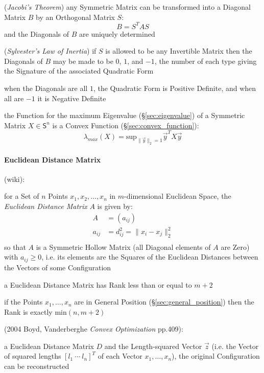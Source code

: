 (\emph{Jacobi's Theorem}) any Symmetric Matrix can be transformed into a
Diagonal Matrix $B$ by an Orthogonal Matrix $S$:
\[
  B = S^T A S
\]
and the Diagonals of $B$ are uniquely determined

(\emph{Sylvester's Law of Inertia}) if $S$ is allowed to be any Invertible
Matrix then the Diagonals of $B$ may be made to be $0$, $1$, and $-1$, the
number of each type giving the Signature of the associated Quadratic Form

when the Diagonals are all $1$, the Quadratic Form is Positive Definite, and
when all are $-1$ it is Negative Definite

the Function for the maximum Eigenvalue (\S\ref{sec:eigenvalue}) of a Symmetric
Matrix $X \in \mathsf{S}^n$ is a Convex Function (\S\ref{sec:convex_function}):
\[
  \lambda_{max}(X) = \mathrm{sup}_{\|\vec{y}\|_2=1} \vec{y}^T X \vec{y}
\]



\paragraph{Euclidean Distance Matrix}\label{sec:euclidean_distance_matrix}\hfill

(wiki):

for a Set of $n$ Points $x_1, x_2, \ldots, x_n$ in $m$-dimensional Euclidean
Space, the \emph{Euclidean Distance Matrix} $A$ is given by:
\begin{align*}
  A      & = (a_{ij}) \\
  a_{ij} & = d_{ij}^2 = \|x_i - x_j\|_2^2 \\
\end{align*}
so that $A$ is a Symmetric Hollow Matrix (all Diagonal elements of $A$ are
Zero) with $a_{ij} \geq 0$, i.e. its elements are the Squares of the Euclidean
Distances between the Vectors of some Configuration

a Euclidean Distance Matrix has Rank less than or equal to $m+2$

if the Points $x_1, \ldots, x_n$ are in General Position
(\S\ref{sec:general_position}) then the Rank is exactly $\mathrm{min}(n,m+2)$

(2004 Boyd, Vanderberghe \emph{Convex Optimization} pp.409):

a Euclidean Distance Matrix $D$ and the Length-squared Vector $\vec{z}$ (i.e.
the Vector of squared lengths $[l_1 \ \cdots \ l_n]^T$ of each Vector $x_1,
\ldots, x_n$), the original Configuration can be reconstructed



